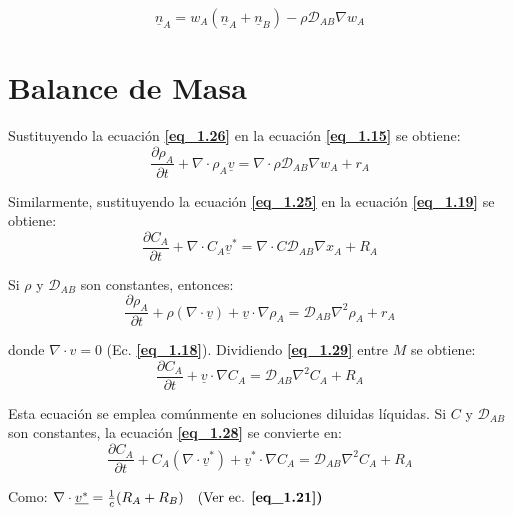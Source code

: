 \begin{equation}
	\underline{n}_A = w_A (\underline{n}_A + \underline{n}_B) - \rho \mathscr{D}_{AB} \nabla w_A  \tag{1.26}\label{eq_1.26}
\end{equation}

 \section{Balance de Masa}
 Sustituyendo la ecuación \textbf{\eqref{eq_1.26}} en la ecuación \textbf{\eqref{eq_1.15}} se obtiene:
 \begin{equation}
 	\frac{\partial \rho_A}{\partial t} + \nabla \cdot \rho_A \underline{v} = \nabla \cdot \rho \mathscr{D}_{AB} \nabla w_A + r_A \tag{1.27}\label{eq_1.27}
 \end{equation}
 
 Similarmente, sustituyendo la ecuación \textbf{\eqref{eq_1.25}} en la ecuación \textbf{\eqref{eq_1.19}} se obtiene:
 \begin{equation}
 	\frac{\partial {C}_A}{\partial t} + \nabla \cdot C_A \underline{v}^* = \nabla \cdot C \mathscr{D}_{AB} \nabla x_A + R_A  \tag{1.28}\label{eq_1.28}
 \end{equation}
 
 Si $\rho$ y $\mathscr{D}_{AB}$ son constantes, entonces:
 \begin{equation}
 	\frac{\partial \rho_A}{\partial t} + \rho  (\nabla\cdot \underline{v})+\underline{v} \cdot \nabla \rho_A = \mathscr{D}_{AB} \nabla^2 \rho_A + r_A  \tag{1.29}\label{eq_1.29}
 \end{equation}
 
 donde $\nabla \cdot v = 0$ (Ec. \textbf{\eqref{eq_1.18}}). Dividiendo \textbf{\eqref{eq_1.29}} entre $M$ se obtiene:
 \begin{equation}
 	\frac{\partial C_A}{\partial t} + \underline{v} \cdot \nabla C_A = \mathscr{D}_{AB} \nabla^2 C_A + R_A  \tag{1.30} \label{eq_1.30}
 \end{equation}
 
 Esta ecuación se emplea comúnmente en soluciones diluidas líquidas. Si $C$ y $\mathscr{D}_{AB}$ son constantes, la ecuación \textbf{\eqref{eq_1.28}} se convierte en:
 \begin{equation}
 	\frac{\partial C_A}{\partial t} +C_A (\nabla \cdot \underline{v}^*)+ \underline{v}^*\cdot\nabla C_A  = \mathscr{D}_{AB} \nabla^2 C_A + R_A \tag {1.31}\label{eq_1.31}
 \end{equation}
 
 Como: $	\nabla \cdot \underline{v^*}= \frac{1}{c} (R_A + R_B) \quad \text{(Ver ec. \textbf{\eqref{eq_1.21})}}$
 

